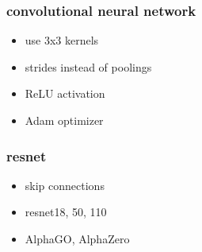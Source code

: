 \documentclass{beamer}
\begin{document}
\begin{frame}
  
  \frametitle{\bf convolutional neural network}    

  
    \begin{itemize}
      \item use 3x3 kernels
      \item strides instead of poolings
      \item ReLU activation
      \item Adam optimizer
    \end{itemize}
\end{frame}


\begin{frame}
  
  \frametitle{\bf resnet}    

  
    \begin{itemize}
      \item skip connections
      \item resnet18, 50, 110
      \item AlphaGO, AlphaZero
    \end{itemize}
\end{frame}
\end{document}
